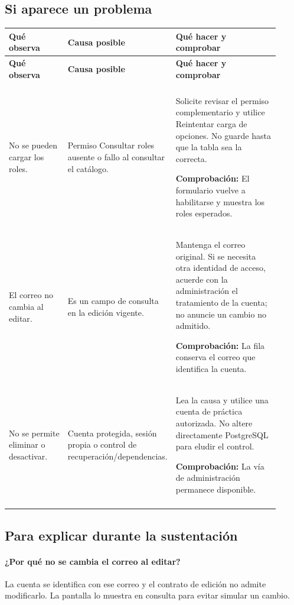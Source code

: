 \subsection{Si aparece un problema}
\begingroup
\fontsize{10}{12.5}\selectfont
\setlength{\tabcolsep}{5pt}
\renewcommand{\arraystretch}{1.15}
\begin{longtable}{@{}>{\RaggedRight\arraybackslash}p{0.22\linewidth}>{\RaggedRight\arraybackslash}p{0.3\linewidth}>{\RaggedRight\arraybackslash}p{0.39\linewidth}@{}}
\toprule
\textbf{Qué observa} & \textbf{Causa posible} & \textbf{Qué hacer y comprobar} \\
\midrule
\endfirsthead
\toprule
\textbf{Qué observa} & \textbf{Causa posible} & \textbf{Qué hacer y comprobar} \\
\midrule
\endhead
\midrule
\multicolumn{3}{r}{\footnotesize Continúa en la página siguiente}\\
\endfoot
\bottomrule
\endlastfoot
No se pueden cargar los roles. & Permiso Consultar roles ausente o fallo al consultar el catálogo. & Solicite revisar el permiso complementario y utilice Reintentar carga de opciones. No guarde hasta que la tabla sea la correcta.\par\smallskip\textbf{Comprobación:} El formulario vuelve a habilitarse y muestra los roles esperados. \\
\addlinespace[3pt]
El correo no cambia al editar. & Es un campo de consulta en la edición vigente. & Mantenga el correo original. Si se necesita otra identidad de acceso, acuerde con la administración el tratamiento de la cuenta; no anuncie un cambio no admitido.\par\smallskip\textbf{Comprobación:} La fila conserva el correo que identifica la cuenta. \\
\addlinespace[3pt]
No se permite eliminar o desactivar. & Cuenta protegida, sesión propia o control de recuperación/dependencias. & Lea la causa y utilice una cuenta de práctica autorizada. No altere directamente PostgreSQL para eludir el control.\par\smallskip\textbf{Comprobación:} La vía de administración permanece disponible. \\
\addlinespace[3pt]
\end{longtable}
\endgroup

\subsection{Para explicar durante la sustentación}
\paragraph{¿Por qué no se cambia el correo al editar?} La cuenta se identifica con ese correo y el contrato de edición no admite modificarlo. La pantalla lo muestra en consulta para evitar simular un cambio.


